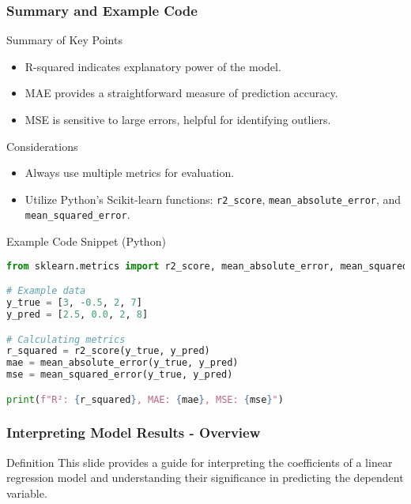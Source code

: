 \documentclass[aspectratio=169]{beamer}
\begin{document}
\begin{frame}[fragile]
    \frametitle{Summary and Example Code}
    \begin{block}{Summary of Key Points}
        \begin{itemize}
            \item R-squared indicates explanatory power of the model.
            \item MAE provides a straightforward measure of prediction accuracy.
            \item MSE is sensitive to large errors, helpful for identifying outliers.
        \end{itemize}
    \end{block}
    
    \begin{block}{Considerations}
        \begin{itemize}
            \item Always use multiple metrics for evaluation.
            \item Utilize Python's Scikit-learn functions: \texttt{r2\_score}, \texttt{mean\_absolute\_error}, and \texttt{mean\_squared\_error}.
        \end{itemize}
    \end{block}
    
    \begin{block}{Example Code Snippet (Python)}
        \begin{lstlisting}[language=Python]
from sklearn.metrics import r2_score, mean_absolute_error, mean_squared_error

# Example data
y_true = [3, -0.5, 2, 7]
y_pred = [2.5, 0.0, 2, 8]

# Calculating metrics
r_squared = r2_score(y_true, y_pred)
mae = mean_absolute_error(y_true, y_pred)
mse = mean_squared_error(y_true, y_pred)

print(f"R²: {r_squared}, MAE: {mae}, MSE: {mse}")
        \end{lstlisting}
    \end{block}
\end{frame}

\begin{frame}[fragile]
    \frametitle{Interpreting Model Results - Overview}
    \begin{block}{Definition}
        This slide provides a guide for interpreting the coefficients of a linear regression model and understanding their significance in predicting the dependent variable.
    \end{block}
\end{frame}
\end{document}
